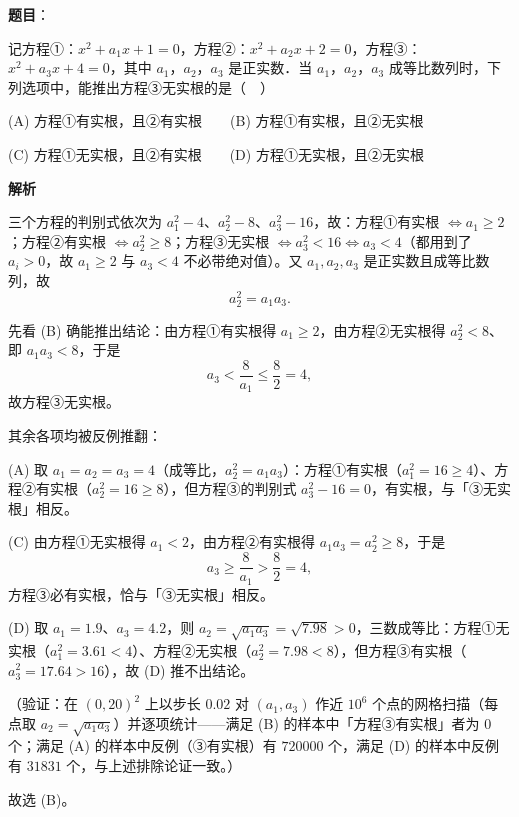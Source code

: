 \begin{answer}

\textbf{题目}：

记方程①：\(x^{2}+a_{1}x+1=0\)，方程②：\(x^{2}+a_{2}x+2=0\)，方程③：\(x^{2}+a_{3}x+4=0\)，其中 \(a_{1}\)，\(a_{2}\)，\(a_{3}\) 是正实数．当 \(a_{1}\)，\(a_{2}\)，\(a_{3}\) 成等比数列时，下列选项中，能推出方程③无实根的是（　）

(A) 方程①有实根，且②有实根　　(B) 方程①有实根，且②无实根

(C) 方程①无实根，且②有实根　　(D) 方程①无实根，且②无实根

\textbf{解析}

三个方程的判别式依次为 \(a_{1}^{2}-4\)、\(a_{2}^{2}-8\)、\(a_{3}^{2}-16\)，故：方程①有实根 \(\iff a_{1}\geqslant2\)；方程②有实根 \(\iff a_{2}^{2}\geqslant8\)；方程③无实根 \(\iff a_{3}^{2}<16\iff a_{3}<4\)（都用到了 \(a_{i}>0\)，故 \(a_{1}\geqslant2\) 与 \(a_{3}<4\) 不必带绝对值）。又 \(a_{1},a_{2},a_{3}\) 是正实数且成等比数列，故
\nopagebreak[4]
\[
a_{2}^{2}=a_{1}a_{3}.
\]

先看 (B) 确能推出结论：由方程①有实根得 \(a_{1}\geqslant2\)，由方程②无实根得 \(a_{2}^{2}<8\)、即 \(a_{1}a_{3}<8\)，于是
\nopagebreak[4]
\[
a_{3}<\frac{8}{a_{1}}\leqslant\frac{8}{2}=4,
\]
故方程③无实根。

其余各项均被反例推翻：

(A) 取 \(a_{1}=a_{2}=a_{3}=4\)（成等比，\(a_{2}^{2}=a_{1}a_{3}\)）：方程①有实根（\(a_{1}^{2}=16\geqslant4\)）、方程②有实根（\(a_{2}^{2}=16\geqslant8\)），但方程③的判别式 \(a_{3}^{2}-16=0\)，有实根，与「③无实根」相反。

(C) 由方程①无实根得 \(a_{1}<2\)，由方程②有实根得 \(a_{1}a_{3}=a_{2}^{2}\geqslant8\)，于是
\nopagebreak[4]
\[
a_{3}\geqslant\frac{8}{a_{1}}>\frac{8}{2}=4,
\]
方程③必有实根，恰与「③无实根」相反。

(D) 取 \(a_{1}=1.9\)、\(a_{3}=4.2\)，则 \(a_{2}=\sqrt{a_{1}a_{3}}=\sqrt{7.98}>0\)，三数成等比：方程①无实根（\(a_{1}^{2}=3.61<4\)）、方程②无实根（\(a_{2}^{2}=7.98<8\)），但方程③有实根（\(a_{3}^{2}=17.64>16\)），故 (D) 推不出结论。

（验证：在 \((0,20)^{2}\) 上以步长 \(0.02\) 对 \((a_{1},a_{3})\) 作近 \(10^{6}\) 个点的网格扫描（每点取 \(a_{2}=\sqrt{a_{1}a_{3}}\)）并逐项统计——满足 (B) 的样本中「方程③有实根」者为 \(0\) 个；满足 (A) 的样本中反例（③有实根）有 \(720000\) 个，满足 (D) 的样本中反例有 \(31831\) 个，与上述排除论证一致。）

故选 (B)。


\end{answer}
